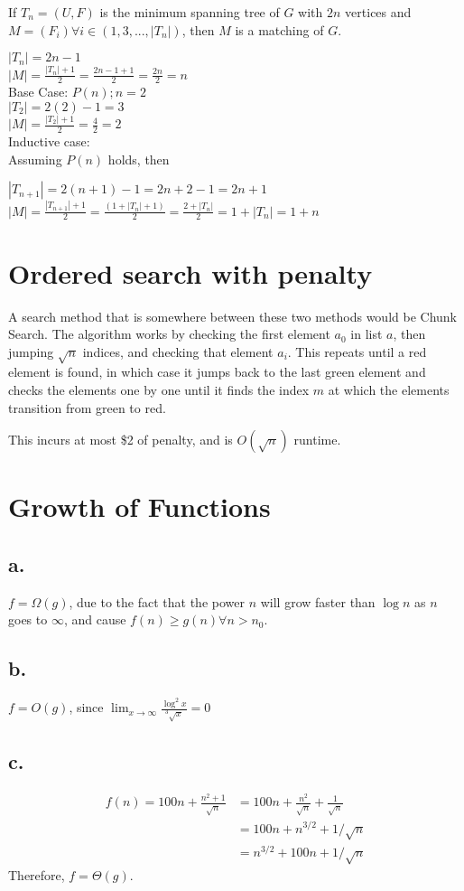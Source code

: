 \documentclass[14pt, letterpaper]{article}
\begin{document}
If $T_n = (U, F)$ is the minimum spanning tree of $G$ with $2n$ vertices and 
$M = (F_i) \forall i \in (1, 3, ..., |T_n|)$, then $M$ is a matching of $G$.

$|T_n| = 2n - 1$ \\
$|M| = \frac{|T_n| + 1}{2} = \frac{2n - 1 + 1}{2} = \frac{2n}{2} = n$ \\

Base Case: $P(n); n = 2$ \\
$|T_2| = 2(2) - 1 = 3$ \\
$|M| = \frac{|T_2| + 1}{2} = \frac{4}{2} = 2$ \\

Inductive case: \\
Assuming $P(n)$ holds, then

$|T_{n + 1}| = 2(n + 1) - 1 = 2n + 2 - 1 = 2n + 1$ \\
$|M| = \frac{|T_{n + 1}| + 1}{2} = \frac{(1 + |T_{n}| + 1)}{2} 
= \frac{2 + |T_n|}{2} = 1 + |T_n| = 1 + n$

\section{Ordered search with penalty}
A search method that is somewhere between these two methods would be Chunk
Search. The algorithm works by checking the first element $a_0$ in list $a$,
then jumping $\sqrt n$ indices, and checking that element $a_i$. This
repeats until a red element is found, in which case it jumps back to the last
green element and checks the elements one by one until it finds the index $m$
at which the elements transition from green to red.

This incurs at most \$2 of penalty, and is $O(\sqrt n)$ runtime.

\section{Growth of Functions}
\subsection{a.}
$f = \Omega(g)$, due to the fact that the power $n$ will grow faster than
$\log n$ as $n$ goes to $\infty$, and cause $f(n) \geq g(n) \forall n > n_0$.

\subsection{b.}
$f = O(g)$, since $\displaystyle \lim_{x \to \infty} \frac{\log^2 x}{^3\sqrt x} = 0$

\subsection{c.}
\begin{equation}
	\begin{split}
		f(n) = 100n + \frac{n^2 + 1}{\sqrt n} & = 100n + \frac{n^2}{\sqrt n} + \frac{1}{\sqrt n} \\
		& = 100n + n^{3/2} + 1/{\sqrt n} \\
		& = n^{3/2} + 100n + 1/{\sqrt n}
	\end{split}
\end{equation}
Therefore, $f = \Theta(g)$.
\end{document}
